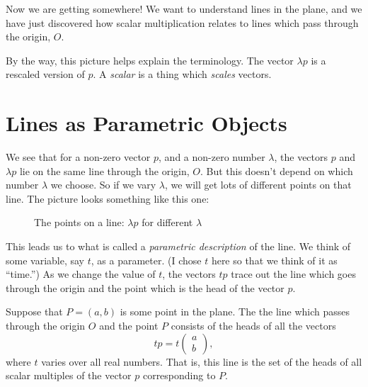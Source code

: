 \documentclass[00-livre-main.tex]{subfiles}
\begin{document}
Now we are getting somewhere! We want to understand lines in the plane, and we have just discovered how scalar multiplication relates to lines which pass through the origin, $O$.

By the way, this picture helps explain the terminology. The vector $\lambda p$ is a rescaled version of $p$. A \emph{scalar} is a thing which \emph{scales} vectors.

\section*{Lines as Parametric Objects}

We see that for a non-zero vector $p$, and a non-zero number $\lambda$, the vectors $p$ and $\lambda p$ lie on the same line through the origin, $O$. But this doesn't depend on which number $\lambda$ we choose. So if we vary $\lambda$, we will get lots of different points on that line.
The picture looks something like this one:
\begin{figure}[h!]
\centering
{}
\caption{The points on a line: $\lambda p$ for different $\lambda$}
\label{fig:line-scalar}
\end{figure}

This leads us to what is called a \emph{parametric description} of the line.
We think of some variable, say $t$, as a parameter.
(I chose $t$ here so that we think of it as ``time.'')
As we change the value of $t$, the vectors $tp$ trace out the line which goes through the origin and the point which is the head of the vector $p$.

\begin{theorem} \label{thm:param-line-origin}
Suppose that $P=(a,b)$ is some point in the plane. The the line which passes through the origin $O$ and the point $P$ consists of the heads of all the vectors
\[
t p = t \begin{pmatrix} a \\ b \end{pmatrix},
\]
where $t$ varies over all real numbers. That is, this line is the set of the heads of all scalar multiples of the vector $p$ corresponding to $P$.
\end{theorem}
\end{document}
